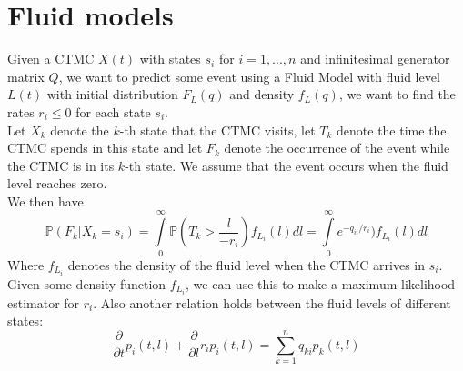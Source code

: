 \section{Fluid models}
Given a CTMC $X(t)$ with states $s_i$ for $i=1,...,n$ and infinitesimal generator matrix $Q$, we want to predict some event using a Fluid Model with fluid level $L(t)$ with initial distribution $F_L(q)$ and density $f_L(q)$, we want to find the rates $r_i\leq 0$ for each state $s_i$.\\
Let $X_k$ denote the $k$-th state that the CTMC visits, let $T_k$ denote the time the CTMC spends in this state and let $F_k$ denote the occurrence of the event while the CTMC is in its $k$-th state. We assume that the event occurs when the fluid level reaches zero.\\
We then have
$$
\mathbb{P}(F_k|X_k=s_i)=\int\limits_0^{\infty}\mathbb{P}(T_k>\frac{l}{-r_i})f_{L_i}(l)dl=\int\limits_0^{\infty}e^{-q_{ii}/r_i})f_{L_i}(l)dl
$$
Where $f_{L_i}$ denotes the density of the fluid level when the CTMC arrives in $s_i$.\\
Given some density function $f_{L_i}$, we can use this to make a maximum likelihood estimator for $r_i$.
Also another relation holds between the fluid levels of different states\citep{Gribaudo2007}:
$$
\frac{\partial}{\partial t}p_i(t,l)+\frac{\partial}{\partial l}r_ip_i(t,l)=\sum\limits_{k=1}^nq_{ki}p_k(t,l)
$$